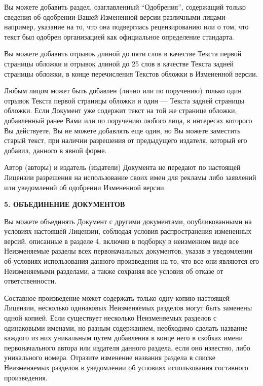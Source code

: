 Вы можете добавить раздел, озаглавленный \enquote{Одобрения},
содержащий только сведения об одобрении Вашей Измененной версии
различными лицами — например, указание на то, что она подверглась
рецензированию или о том, что текст был одобрен организацией как
официальное определение стандарта.

Вы можете добавить отрывок длиной до пяти слов в качестве Текста
первой страницы обложки и отрывок длиной до 25 слов в качестве Текста
задней страницы обложки, в конце перечисления Текстов обложки в
Измененной версии.

Любым лицом может быть добавлен (лично или по поручению) только один
отрывок Текста первой страницы обложки и один — Текста задней страницы
обложки. Если Документ уже содержит текст на той же странице обложки,
добавленный ранее Вами или по поручению любого лица, в интересах
которого Вы действуете, Вы не можете добавлять еще один, но Вы можете
заместить старый текст, при наличии разрешения от предыдущего
издателя, который его добавил, данного в явной форме.

Автор (авторы) и издатель (издатели) Документа не передают по
настоящей Лицензии разрешения на использование своих имен для рекламы
либо заявлений или уведомлений об одобрении Измененной версии.

\begin{center}
{\Large\bf 5. ОБЪЕДИНЕНИЕ ДОКУМЕНТОВ\par}
\end{center}

Вы можете объединять Документ с другими документами, опубликованными
на условиях настоящей Лицензии, соблюдая условия распространения
измененных версий, описанные в разделе 4, включив в подборку в
неизменном виде все Неизменяемые разделы всех первоначальных
документов, указав в уведомлении об условиях использования данного
произведения на то, что все они являются его Неизменяемыми разделами,
а также сохраняя все условия об отказе от ответственности.

Составное произведение может содержать только одну копию настоящей
Лицензии, несколько одинаковых Неизменяемых разделов могут быть
заменены одной копией. Если существует несколько Неизменяемых разделов
с одинаковыми именами, но разным содержанием, необходимо сделать
название каждого из них уникальным путем добавления в конце него в
скобках имени первоначального автора или издателя данного раздела,
если оно известно, либо уникального номера. Отразите изменение
названия раздела в списке Неизменяемых разделов в уведомлении об
условиях использования составного произведения.

